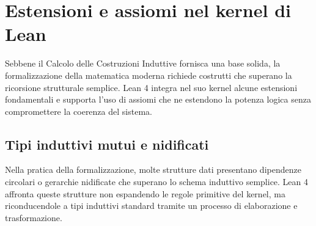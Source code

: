 \section{Estensioni e assiomi nel kernel di Lean}
Sebbene il Calcolo delle Costruzioni Induttive fornisca una base solida, la formalizzazione della matematica moderna richiede costrutti che superano 
la ricorsione strutturale semplice. Lean 4 integra nel suo kernel alcune estensioni fondamentali e supporta l'uso di assiomi che ne estendono la potenza 
logica senza compromettere la coerenza del sistema.

\subsection{Tipi induttivi mutui e nidificati}
Nella pratica della formalizzazione, molte strutture dati presentano dipendenze circolari o gerarchie nidificate che superano lo schema induttivo semplice. 
Lean 4 affronta queste strutture non espandendo le regole primitive del kernel, ma riconducendole a tipi induttivi standard tramite un processo di elaborazione 
e trasformazione.

